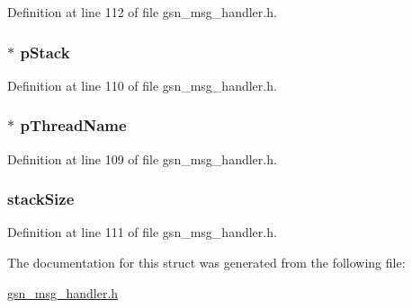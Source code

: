 Definition at line 112 of file gsn\_\-msg\_\-handler.h.

\hypertarget{a00154_a06dc12db7ec3c52d8dc551e9e8f77e63}{
\subsubsection[{pStack}]{$\ast$ {\bf pStack}}}
\label{a00154_a06dc12db7ec3c52d8dc551e9e8f77e63}


Definition at line 110 of file gsn\_\-msg\_\-handler.h.

\hypertarget{a00154_a68c7baaa708ea9444e91f4e331ebc579}{
\subsubsection[{pThreadName}]{$\ast$ {\bf pThreadName}}}
\label{a00154_a68c7baaa708ea9444e91f4e331ebc579}


Definition at line 109 of file gsn\_\-msg\_\-handler.h.

\hypertarget{a00154_a82cabdcaee43fc729a1da5551d429f73}{
\subsubsection[{stackSize}]{ {\bf stackSize}}}
\label{a00154_a82cabdcaee43fc729a1da5551d429f73}


Definition at line 111 of file gsn\_\-msg\_\-handler.h.



The documentation for this struct was generated from the following file:\begin{DoxyCompactItemize}
\item 
\hyperlink{a00528}{gsn\_\-msg\_\-handler.h}\end{DoxyCompactItemize}
